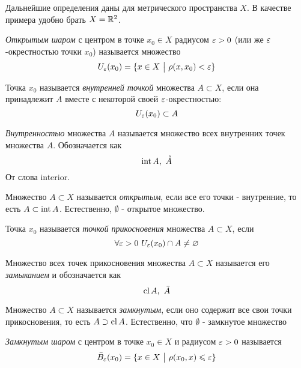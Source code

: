 \begin{note}
	Дальнейшие определения даны для метрического пространства $X$. В качестве примера удобно брать $X = \mathbb{R}^2$.
\end{note}

\begin{definition}
	\textit{Открытым шаром} с центром в точке $x_0 \in X$ радиусом $\varepsilon > 0$ (или же $\varepsilon$-окрестностью точки $x_0$) называется множество
	\[
		U_\varepsilon(x_0) = \{x \in X \ \big|\  \rho(x, x_0) < \varepsilon\}
	\]
\end{definition}

\begin{definition}
	Точка $x_0$ называется \textit{внутренней точкой} множества $A \subset X$, если она принадлежит $A$ вместе с некоторой своей $\varepsilon$-окрестностью:
	\[
		U_\varepsilon(x_0) \subset A
	\]
\end{definition}

\begin{definition}
	\textit{Внутренностью} множества $A$ называется множество всех внутренних точек множества $A$. Обозначается как
	\[
		\operatorname{int} A,\ \mathring{A}
	\]
	От слова interior.
\end{definition}

\begin{definition}
	Множество $A \subset X$ называется \textit{открытым}, если все его точки - внутренние, то есть $A \subset \operatorname{int} A$. Естественно, $\emptyset$ - открытое множество.
\end{definition}

\begin{definition}
	Точка $x_0$ называется \textit{точкой прикосновения} множества $A \subset X$, если
	\[
		\forall \varepsilon > 0\ U_\varepsilon(x_0) \cap A \neq \varnothing
	\]
\end{definition}

\begin{definition}
	Множество всех точек прикосновения множества $A \subset X$ называется его \textit{замыканием} и обозначается как
	\[
		\operatorname{cl} A,\ \bar{A}
	\]
\end{definition}

\begin{definition}
	Множество $A \subset X$ называется \textit{замкнутым}, если оно содержит все свои точки прикосновения, то есть $A \supset \operatorname{cl} A$. Естественно, что $\emptyset$ - замкнутое множество
\end{definition}

\begin{definition}
	\textit{Замкнутым шаром} с центром в точке $x_0 \in X$ и радиусом $\varepsilon > 0$ называется
	\[
		\bar{B}_\varepsilon(x_0) = \{x \in X \ \big|\  \rho(x_0, x) \leqslant \varepsilon\}
	\] 
\end{definition}

